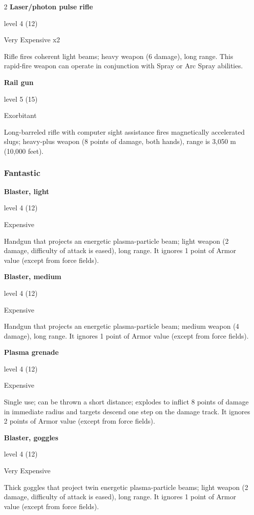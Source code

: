 \begin{multicols}{2}
\textbf{Laser/photon pulse rifle} 

level 4 (12) 

Very Expensive x2 

Rifle fires coherent light beams; heavy weapon (6 damage), long range. This rapid-fire weapon can operate in conjunction with Spray or Arc Spray abilities. 

\textbf{Rail gun} 

level 5 (15) 

Exorbitant 

Long-barreled rifle with computer sight assistance fires magnetically accelerated slugs; heavy-plus weapon (8 points of damage, both hands), range is 3,050 m (10,000 feet).

\subsubsection{Fantastic}

\textbf{Blaster, light} 

level 4 (12) 

Expensive 

Handgun that projects an energetic plasma-particle beam; light weapon (2 damage, difficulty of attack is eased), long range. It ignores 1 point of Armor value (except from force fields). 

\textbf{Blaster, medium} 

level 4 (12) 

Expensive 

Handgun that projects an energetic plasma-particle beam; medium weapon (4 damage), long range. It ignores 1 point of Armor value (except from force fields).

\textbf{Plasma grenade}

level 4 (12) 

Expensive 

Single use; can be thrown a short distance; explodes to inflict 8 points of damage in immediate radius and targets descend one step on the damage track. It ignores 2 points of Armor value (except from force fields). 

\textbf{Blaster, goggles} 

level 4 (12) 

Very Expensive 

Thick goggles that project twin energetic plasma-particle beams; light weapon (2 damage, difficulty of attack is eased), long range. It ignores 1 point of Armor value (except from force fields). 


\end{multicols}
